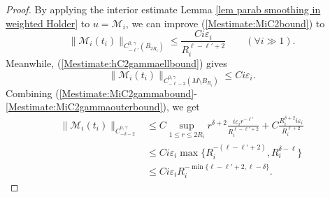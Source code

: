 \documentclass[12pt]{amsart}
\newcommand{\calM}{\mathcal{M}}
\renewcommand{\1}{{\mathbf 1}}
\newcommand{\eps}{{\varepsilon}}
\theoremstyle{others}
\numberwithin{equation}{section}
\begin{document}
\begin{proof}

By applying the interior estimate Lemma \ref{lem parab smoothing in weighted Holder} to $u = \mathcal M_i$, we can improve (\ref{Mestimate:MiC2bound}) to
    \begin{equation}\label{Mestimate:MiC2gammabound}
        \| \mathcal M_i(t_i) \|_{C^{0, \gamma}_{-\ell'} \left(B_{2R_i} \right) } \leq 
        \frac{C i \eps_i}{R_i^{\ell - \ell' + 2} } \qquad (\forall i \gg 1).
    \end{equation}
    Meanwhile, %
    (\ref{Mestimate:hC2gammaellbound}) gives
    \begin{equation}\label{Mestimate:MiC2gammaouterbound}
        \| \calM_i(t_i) \|_{C_{-\ell - 2}^{0,\gamma} \left( M \setminus B_{R_i} \right) } \leq C i \eps_i. %
    \end{equation}
Combining (\ref{Mestimate:MiC2gammabound}-\ref{Mestimate:MiC2gammaouterbound}), we get
    \begin{equation}\label{Mestimate:Mideltaest}
    \begin{split}
        \| \calM_i(t_i) \|_{C_{-\delta - 2}^{0,\gamma} } & \leq C \sup_{1 \leq r \leq 2R_i} r^{\delta + 2} \frac{i\eps_i r^{-\ell'}}{R_i^{\ell - \ell' + 2}} + C \frac{R_i^{\delta + 2} i\eps_i}{R_i^{\ell + 2} } \\
        & \leq C i \eps_i \max\{ R_i^{-(\ell - \ell' + 2)}, R_i^{\delta - \ell}  \} \\
        & \leq C i \eps_i R_i^{-\min \{\ell - \ell' + 2, \ell - \delta \}}.
        \end{split}
    \end{equation}


\end{proof}
\end{document}
